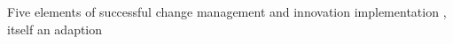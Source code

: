Five elements of successful change management and innovation implementation \cite{ADEC2016}, itself an adaption \cite{Thousand2001}